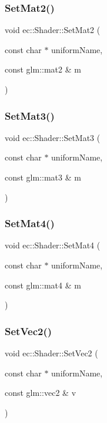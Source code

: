 \subsubsection{\texorpdfstring{Set\+Mat2()}{SetMat2()}}
{\footnotesize\ttfamily void ec\+::\+Shader\+::\+Set\+Mat2 (\begin{DoxyParamCaption}\item[{const char $\ast$}]{uniform\+Name,  }\item[{const glm\+::mat2 \&}]{m }\end{DoxyParamCaption})}

\mbox{\label{classec_1_1_shader_a64b0b8886f81ff7c862800ac6a885553}} 
\subsubsection{\texorpdfstring{Set\+Mat3()}{SetMat3()}}
{\footnotesize\ttfamily void ec\+::\+Shader\+::\+Set\+Mat3 (\begin{DoxyParamCaption}\item[{const char $\ast$}]{uniform\+Name,  }\item[{const glm\+::mat3 \&}]{m }\end{DoxyParamCaption})}

\mbox{\label{classec_1_1_shader_a8f549ed9012b1c2c38b8fa1692c5cad2}} 
\subsubsection{\texorpdfstring{Set\+Mat4()}{SetMat4()}}
{\footnotesize\ttfamily void ec\+::\+Shader\+::\+Set\+Mat4 (\begin{DoxyParamCaption}\item[{const char $\ast$}]{uniform\+Name,  }\item[{const glm\+::mat4 \&}]{m }\end{DoxyParamCaption})}

\mbox{\label{classec_1_1_shader_a3bf37ff90f42307430e07cd9a213513f}} 
\subsubsection{\texorpdfstring{Set\+Vec2()}{SetVec2()}}
{\footnotesize\ttfamily void ec\+::\+Shader\+::\+Set\+Vec2 (\begin{DoxyParamCaption}\item[{const char $\ast$}]{uniform\+Name,  }\item[{const glm\+::vec2 \&}]{v }\end{DoxyParamCaption})}

